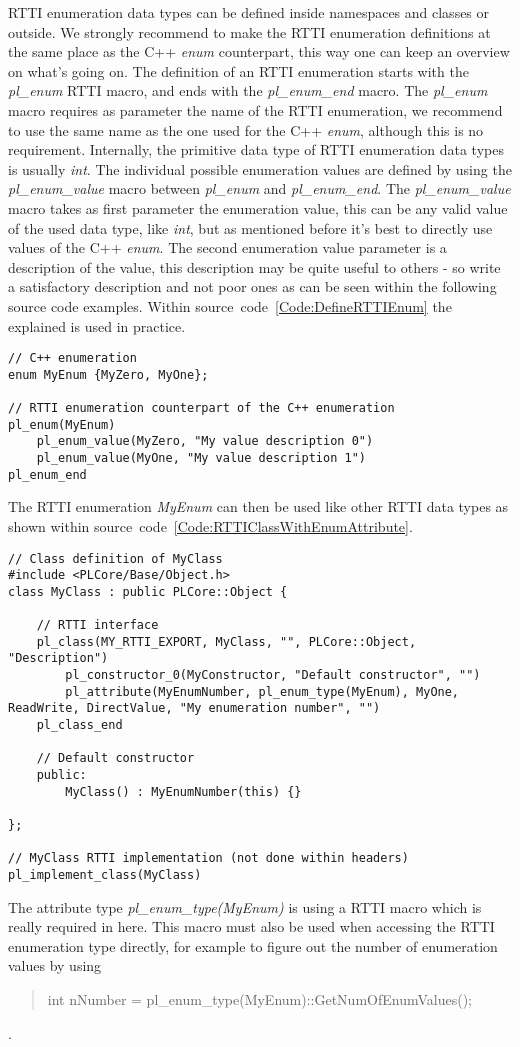 RTTI enumeration data types can be defined inside namespaces and classes or outside. We strongly recommend to make the RTTI enumeration definitions at the same place as the C++ \emph{enum} counterpart, this way one can keep an overview on what's going on. The definition of an RTTI enumeration starts with the \emph{pl\_enum} RTTI macro, and ends with the \emph{pl\_enum\_end} macro. The \emph{pl\_enum} macro requires as parameter the name of the RTTI enumeration, we recommend to use the same name as the one used for the C++ \emph{enum}, although this is no requirement. Internally, the primitive data type of RTTI enumeration data types is usually \emph{int}. The individual possible enumeration values are defined by using the \emph{pl\_enum\_value} macro between \emph{pl\_enum} and \emph{pl\_enum\_end}. The \emph{pl\_enum\_value} macro takes as first parameter the enumeration value, this can be any valid value of the used data type, like \emph{int}, but as mentioned before it's best to directly use values of the C++ \emph{enum}. The second enumeration value parameter is a description of the value, this description may be quite useful to others - so write a satisfactory description and not poor ones as can be seen within the following source code examples. Within source~code~\ref{Code:DefineRTTIEnum} the explained is used in practice.
\begin{lstlisting}[float=htb,label=Code:DefineRTTIEnum,caption={Defining a new RTTI enumeration}]
// C++ enumeration
enum MyEnum {MyZero, MyOne};

// RTTI enumeration counterpart of the C++ enumeration
pl_enum(MyEnum)
	pl_enum_value(MyZero, "My value description 0")
	pl_enum_value(MyOne, "My value description 1")
pl_enum_end
\end{lstlisting}
The RTTI enumeration \emph{MyEnum} can then be used like other RTTI data types as shown within source~code~\ref{Code:RTTIClassWithEnumAttribute}.
\begin{lstlisting}[label=Code:RTTIClassWithEnumAttribute,caption={Defining a new RTTI class with an enumeration attribute}]
// Class definition of MyClass
#include <PLCore/Base/Object.h>
class MyClass : public PLCore::Object {

	// RTTI interface
	pl_class(MY_RTTI_EXPORT, MyClass, "", PLCore::Object, "Description")
		pl_constructor_0(MyConstructor, "Default constructor", "")
		pl_attribute(MyEnumNumber, pl_enum_type(MyEnum), MyOne, ReadWrite, DirectValue, "My enumeration number", "")
	pl_class_end

	// Default constructor
	public:
		MyClass() : MyEnumNumber(this) {}

};

// MyClass RTTI implementation (not done within headers)
pl_implement_class(MyClass)
\end{lstlisting}
The attribute type \emph{pl\_enum\_type(MyEnum)} is using a RTTI macro which is really required in here. This macro must also be used when accessing the RTTI enumeration type directly, for example to figure out the number of enumeration values by using \begin{quote}int nNumber = pl\_enum\_type(MyEnum)::GetNumOfEnumValues();\end{quote}.

